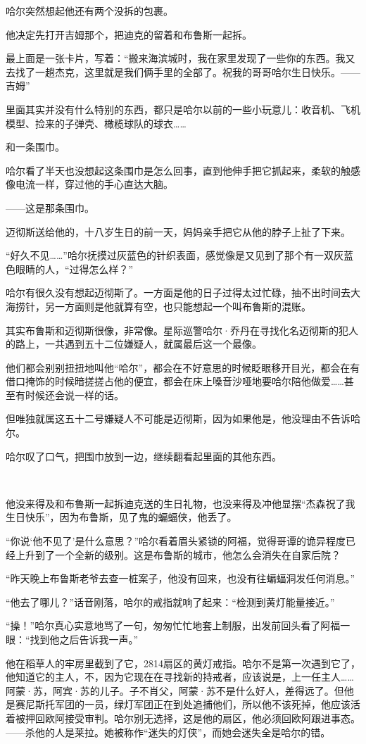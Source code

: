 \documentclass[../main]{subfiles}
\begin{document}
哈尔突然想起他还有两个没拆的包裹。

他决定先打开吉姆那个，把迪克的留着和布鲁斯一起拆。

最上面是一张卡片，写着：“搬来海滨城时，我在家里发现了一些你的东西。我又去找了一趟杰克，这里就是我们俩手里的全部了。祝我的哥哥哈尔生日快乐。——吉姆”

里面其实并没有什么特别的东西，都只是哈尔以前的一些小玩意儿：收音机、飞机模型、捡来的子弹壳、橄榄球队的球衣……

和一条围巾。

哈尔看了半天也没想起这条围巾是怎么回事，直到他伸手把它抓起来，柔软的触感像电流一样，穿过他的手心直达大脑。

——这是那条围巾。

迈彻斯送给他的，十八岁生日的前一天，妈妈亲手把它从他的脖子上扯了下来。

“好久不见……”哈尔抚摸过灰蓝色的针织表面，感觉像是又见到了那个有一双灰蓝色眼睛的人，“过得怎么样？”

哈尔有很久没有想起迈彻斯了。一方面是他的日子过得太过忙碌，抽不出时间去大海捞针，另一方面则是他就算有空，也只能想起一个叫布鲁斯的混账。

其实布鲁斯和迈彻斯很像，非常像。星际巡警哈尔·乔丹在寻找化名迈彻斯的犯人的路上，一共遇到五十二位嫌疑人，就属最后这一个最像。

他们都会别别扭扭地叫他“哈尔”，都会在不好意思的时候眨眼移开目光，都会在有借口掩饰的时候暗搓搓占他的便宜，都会在床上嗓音沙哑地要哈尔陪他做爱……甚至有时候还会说一样的话。

但唯独就属这五十二号嫌疑人不可能是迈彻斯，因为如果他是，他没理由不告诉哈尔。

哈尔叹了口气，把围巾放到一边，继续翻看起里面的其他东西。

~\

他没来得及和布鲁斯一起拆迪克送的生日礼物，也没来得及冲他显摆“杰森祝了我生日快乐”，因为布鲁斯，见了鬼的蝙蝠侠，他丢了。

“你说‘他不见了’是什么意思？”哈尔看着眉头紧锁的阿福，觉得哥谭的诡异程度已经上升到了一个全新的级别。这是布鲁斯的城市，他怎么会消失在自家后院？

“昨天晚上布鲁斯老爷去查一桩案子，他没有回来，也没有往蝙蝠洞发任何消息。”

“他去了哪儿？”话音刚落，哈尔的戒指就响了起来：“检测到黄灯能量接近。”

“操！”哈尔真心实意地骂了一句，匆匆忙忙地套上制服，出发前回头看了阿福一眼：“找到他之后告诉我一声。”

他在稻草人的牢房里截到了它，2814扇区的黄灯戒指。哈尔不是第一次遇到它了，他知道它的主人，不，因为它现在在寻找新的持戒者，应该说是，上一任主人……阿蒙·苏，阿宾·苏的儿子。子不肖父，阿蒙·苏不是什么好人，差得远了。但他是赛尼斯托军团的一员，绿灯军团正在到处追捕他们，所以他不该死掉，他应该活着被押回欧阿接受审判。哈尔别无选择，这是他的扇区，他必须回欧阿跟进事态。——杀他的人是莱拉。她被称作“迷失的灯侠”，而她会迷失全是哈尔的错。
\end{document}
